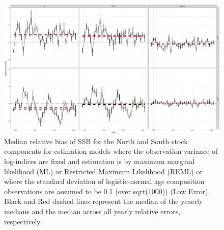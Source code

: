 \documentclass[
]{article}
\begin{document}
\begin{landscape}
 
\begin{figure}

{\centering \includegraphics[width=1\linewidth]{self_test_results} 

}

\caption{Median relative bias of SSB for the North and South stock components for estimation models where the observation variance of log-indices are fixed and estimation is by maximum marginal likelihood (ML) or Restricted Maximum Likelihood (REML) or where the standard deviation of logistic-normal age composition observations are assumed to be 0.1 (over sqrt(1000)) (Low Error). Black and Red dashed lines represent the median of the yeaerly medians and the median across all yearly relative errors, respectively.}\label{fig:self-test-fig}
\end{figure}
\end{landscape}
\end{document}
